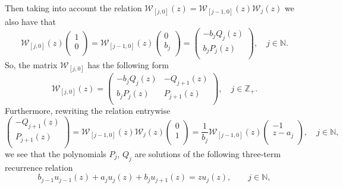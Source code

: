 \documentclass{amsart}
\theoremstyle{remark}
\numberwithin{equation}{section}
\begin{document}
Then taking into account the relation ${{\mathcal W}}_{[j,0]}(z)={{\mathcal W}}_{[j-1,0]}(z){{\mathcal W}}_{j}(z)$ we also have that
\begin{equation*}
{{\mathcal W}}_{[j,0]}(z)\left(\begin{array}{c}
  1 \\
  0 \\
\end{array}\right)=
{{\mathcal W}}_{[j-1,0]}(z)\left(\begin{array}{c}
  0 \\
  b_j \\
\end{array}\right)=
\left(\begin{array}{c}
  -b_j Q_j(z) \\
  b_j P_j(z) \\
\end{array}\right), \quad j\in{{\mathbb N}}.
\end{equation*}
So, the matrix ${{\mathcal W}}_{[j,0]}$ has the following form
\begin{equation*}
{{\mathcal W}}_{[j,0]}(z)=\left(\begin{array}{cc}
  -b_j Q_j(z) & -Q_{j+1}(z) \\
  b_j P_j(z) & P_{j+1}(z) \\
\end{array}\right), \quad j\in{{\mathbb Z}}_+ .
\end{equation*}
Furthermore, rewriting the relation entrywise
\[
\left(\begin{array}{c}
 -Q_{j+1}(z) \\
 P_{j+1}(z) \\
\end{array}\right)={{\mathcal W}}_{[j-1,0]}(z){{\mathcal W}}_{j}(z)\left(\begin{array}{c}
  0 \\
  1 \\
\end{array}\right)=
\frac{1}{b_j}{{\mathcal W}}_{[j-1,0]}(z)\left(\begin{array}{c}
  -1 \\
  z-a_j \\
\end{array}\right), \quad j\in{{\mathbb N}},
\]
we see that the polynomials $P_{j}$, $Q_{j}$ are solutions of the following three-term recurrence relation
\begin{equation}\label{3termOP}
b_{j-1}u_{j-1}(z)+a_ju_{j}(z)+b_{j}u_{j+1}(z)=zu_j(z),\qquad j\in{{\mathbb N}},
\end{equation}
\end{document}
